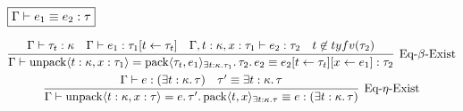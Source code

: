 $\fbox{$\Gamma \vdash e_1 \equiv e_2: \tau$}$

\begin{gather*}
  \infer[\text{Eq-$\beta$-Exist}]{\Gamma \vdash \symunpack\langle t: \kappa, x: \tau_1\rangle = \sympack\langle \tau_t, e_1\rangle_{\exists t: \kappa\ldotp \tau_1}\ldotp \tau_2\ldotp e_2 \equiv e_2[t \assign \tau_t][x \assign e_1]: \tau_2}{
    \Gamma \vdash \tau_t: \kappa
    &
    \Gamma \vdash e_1: \tau_1[t \assign \tau_t]
    &
    \Gamma, t: \kappa, x: \tau_1 \vdash e_2: \tau_2
    &
    t \not\in \typefreevar(\tau_2)
  }
  \\
  \infer[\text{Eq-$\eta$-Exist}]{\Gamma \vdash \symunpack\langle t: \kappa, x: \tau\rangle = e\ldotp\tau'\ldotp \sympack\langle t, x\rangle_{\exists t: \kappa\ldotp \tau} \equiv e: (\exists t: \kappa\ldotp \tau)}{
    \Gamma \vdash e: (\exists t: \kappa\ldotp \tau)
    &
    \tau' \equiv \exists t: \kappa\ldotp \tau
  }
\end{gather*}
